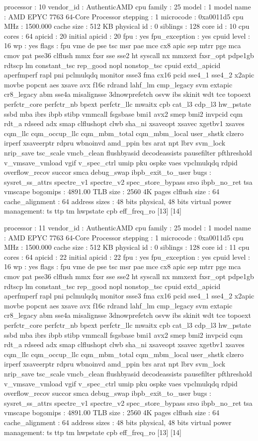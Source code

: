 processor	: 10
vendor_id	: AuthenticAMD
cpu family	: 25
model		: 1
model name	: AMD EPYC 7763 64-Core Processor
stepping	: 1
microcode	: 0xa0011d5
cpu MHz		: 1500.000
cache size	: 512 KB
physical id	: 0
siblings	: 128
core id		: 10
cpu cores	: 64
apicid		: 20
initial apicid	: 20
fpu		: yes
fpu_exception	: yes
cpuid level	: 16
wp		: yes
flags		: fpu vme de pse tsc msr pae mce cx8 apic sep mtrr pge mca cmov pat pse36 clflush mmx fxsr sse sse2 ht syscall nx mmxext fxsr_opt pdpe1gb rdtscp lm constant_tsc rep_good nopl nonstop_tsc cpuid extd_apicid aperfmperf rapl pni pclmulqdq monitor ssse3 fma cx16 pcid sse4_1 sse4_2 x2apic movbe popcnt aes xsave avx f16c rdrand lahf_lm cmp_legacy svm extapic cr8_legacy abm sse4a misalignsse 3dnowprefetch osvw ibs skinit wdt tce topoext perfctr_core perfctr_nb bpext perfctr_llc mwaitx cpb cat_l3 cdp_l3 hw_pstate ssbd mba ibrs ibpb stibp vmmcall fsgsbase bmi1 avx2 smep bmi2 invpcid cqm rdt_a rdseed adx smap clflushopt clwb sha_ni xsaveopt xsavec xgetbv1 xsaves cqm_llc cqm_occup_llc cqm_mbm_total cqm_mbm_local user_shstk clzero irperf xsaveerptr rdpru wbnoinvd amd_ppin brs arat npt lbrv svm_lock nrip_save tsc_scale vmcb_clean flushbyasid decodeassists pausefilter pfthreshold v_vmsave_vmload vgif v_spec_ctrl umip pku ospke vaes vpclmulqdq rdpid overflow_recov succor smca debug_swap ibpb_exit_to_user
bugs		: sysret_ss_attrs spectre_v1 spectre_v2 spec_store_bypass srso ibpb_no_ret tsa vmscape
bogomips	: 4891.00
TLB size	: 2560 4K pages
clflush size	: 64
cache_alignment	: 64
address sizes	: 48 bits physical, 48 bits virtual
power management: ts ttp tm hwpstate cpb eff_freq_ro [13] [14]

processor	: 11
vendor_id	: AuthenticAMD
cpu family	: 25
model		: 1
model name	: AMD EPYC 7763 64-Core Processor
stepping	: 1
microcode	: 0xa0011d5
cpu MHz		: 1500.000
cache size	: 512 KB
physical id	: 0
siblings	: 128
core id		: 11
cpu cores	: 64
apicid		: 22
initial apicid	: 22
fpu		: yes
fpu_exception	: yes
cpuid level	: 16
wp		: yes
flags		: fpu vme de pse tsc msr pae mce cx8 apic sep mtrr pge mca cmov pat pse36 clflush mmx fxsr sse sse2 ht syscall nx mmxext fxsr_opt pdpe1gb rdtscp lm constant_tsc rep_good nopl nonstop_tsc cpuid extd_apicid aperfmperf rapl pni pclmulqdq monitor ssse3 fma cx16 pcid sse4_1 sse4_2 x2apic movbe popcnt aes xsave avx f16c rdrand lahf_lm cmp_legacy svm extapic cr8_legacy abm sse4a misalignsse 3dnowprefetch osvw ibs skinit wdt tce topoext perfctr_core perfctr_nb bpext perfctr_llc mwaitx cpb cat_l3 cdp_l3 hw_pstate ssbd mba ibrs ibpb stibp vmmcall fsgsbase bmi1 avx2 smep bmi2 invpcid cqm rdt_a rdseed adx smap clflushopt clwb sha_ni xsaveopt xsavec xgetbv1 xsaves cqm_llc cqm_occup_llc cqm_mbm_total cqm_mbm_local user_shstk clzero irperf xsaveerptr rdpru wbnoinvd amd_ppin brs arat npt lbrv svm_lock nrip_save tsc_scale vmcb_clean flushbyasid decodeassists pausefilter pfthreshold v_vmsave_vmload vgif v_spec_ctrl umip pku ospke vaes vpclmulqdq rdpid overflow_recov succor smca debug_swap ibpb_exit_to_user
bugs		: sysret_ss_attrs spectre_v1 spectre_v2 spec_store_bypass srso ibpb_no_ret tsa vmscape
bogomips	: 4891.00
TLB size	: 2560 4K pages
clflush size	: 64
cache_alignment	: 64
address sizes	: 48 bits physical, 48 bits virtual
power management: ts ttp tm hwpstate cpb eff_freq_ro [13] [14]

